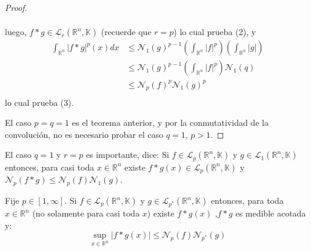 \documentclass[12pt]{report}
\theoremstyle{largebreak}
\newcommand\abs[1]{\ensuremath{\big|#1\big|}}
\newcommand{\N}[2]{\ensuremath{\mathcal{N}_{#1}\left(#2\right)}}
\begin{document}
\begin{proof}
\begin{enumerate}
\begin{equation*}
\begin{split}
                \end{split}
            \end{equation*}
            luego, $f*g\in\mathcal{L}_r(\mathbb{R}^n,\mathbb{K})$ (recuerde que $r=p$) lo cual prueba (2), y
            \begin{equation*}
                \begin{split}
                    \int_{\mathbb{R}^n}\abs{f*g}^p(x)dx&\leq\N{1}{g}^{p-1}\left(\int_{\mathbb{R}^n}\abs{f}^p \right)\left(\int_{\mathbb{R}^n}\abs{g} \right)\\
                    &\leq\N{1}{g}^{p-1}\left(\int_{\mathbb{R}^n}\abs{f}^p \right)\N{1}{q}\\
                    &\leq\N{p}{f}^p\N{1}{g}^{p} \\
                \end{split}
            \end{equation*}
            lo cual prueba (3).
        \end{enumerate}

        El caso $p=q=1$ es el teorema anterior, y por la conmutatividad de la convolución, no es necesario probar el caso $q=1$, $p>1$.
    \end{proof}

    \begin{obs}
        El caso $q=1$ y $r=p$ es importante, dice: Si $f\in\mathcal{L}_p(\mathbb{R}^n,\mathbb{K})$ y $g\in\mathcal{L}_1(\mathbb{R}^n,\mathbb{K})$ entonces, para casi toda $x\in\mathbb{R}^n$ existe $f*g(x)\in\mathcal{L}_p(\mathbb{R}^n,\mathbb{K})$ y $\N{p}{f*g}\leq\N{p}{f}\N{1}{g}$.
    \end{obs}

    \begin{theor}
        Fije $p\in[1,\infty]$. Si $f\in\mathcal{L}_p(\mathbb{R}^n,\mathbb{K})$ y $g\in\mathcal{L}_{ p^*}(\mathbb{R}^n,\mathbb{K})$ entonces, para toda $x\in\mathbb{R}^n$ (no solamente para casi toda $x$) existe $f*g(x)$ ,$f*g$ es medible acotada y:
        \begin{equation*}
            \sup_{ x\in\mathbb{R}^n}\abs{f*g(x)}\leq\N{p}{f}\N{p^*}{g}
        \end{equation*}
    \end{theor}
\end{document}
